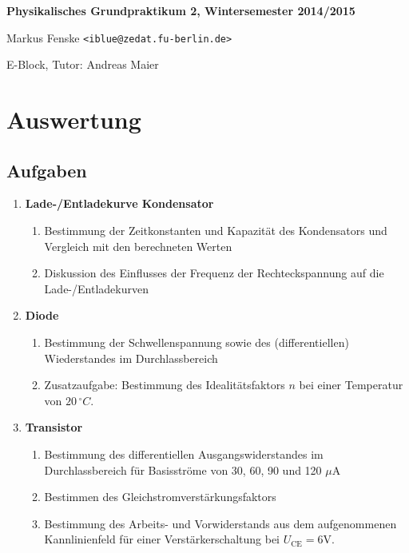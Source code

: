 \documentclass[a4paper,german,12pt,smallheadings]{scrartcl}
\begin{document}
\allowdisplaybreaks %
\begin{center}
\bfseries %
\sffamily %
\vspace{-40pt}
Physikalisches Grundpraktikum 2, Wintersemester 2014/2015

Markus Fenske \texttt{<iblue@zedat.fu-berlin.de>}

E-Block, Tutor: Andreas Maier
\vspace{-10pt}
\end{center}
\section{Auswertung}

\subsection{Aufgaben}
\begin{enumerate}
  \item \textbf{Lade-/Entladekurve Kondensator}
    \begin{enumerate}
      \item  Bestimmung der Zeitkonstanten und Kapazität des Kondensators und
        Vergleich mit den berechneten Werten
      \item Diskussion des Einflusses der Frequenz der Rechteckspannung auf die
        Lade-/Entladekurven
    \end{enumerate}
  \item \textbf{Diode}
    \begin{enumerate}
      \item Bestimmung der Schwellenspannung sowie des (differentiellen)
        Wiederstandes im Durchlassbereich
      \item Zusatzaufgabe: Bestimmung des Idealitätsfaktors $n$ bei einer
        Temperatur von $20\,^\circ C$.
    \end{enumerate}
  \item \textbf{Transistor}
    \begin{enumerate}
      \item Bestimmung des differentiellen Ausgangswiderstandes im
        Durchlassbereich für Basisströme von 30, 60, 90 und 120 $\mu$A
      \item Bestimmen des Gleichstromverstärkungsfaktors
      \item Bestimmung des Arbeits- und Vorwiderstands aus dem aufgenommenen
        Kannlinienfeld für einer Verstärkerschaltung bei $U_\text{CE} = 6
        \text{V}$.
    \end{enumerate}
\end{enumerate}
\end{document}
